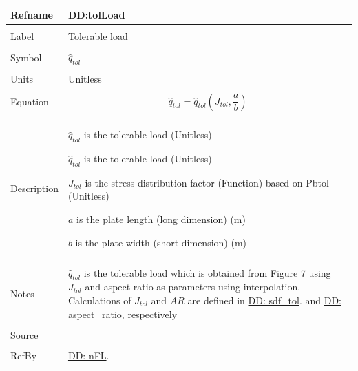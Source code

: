 \documentclass[12pt]{article}
\begin{document}
~\newline
\noindent \begin{minipage}{\textwidth}
\begin{tabular}{p{} p{}}
\toprule \textbf{Refname} & \textbf{DD:tolLoad}
\label{DD:tolLoad}
\\ \midrule \\
Label & Tolerable load
\\ \midrule \\
Symbol & ${\hat{q}_{tol}}$
\\ \midrule \\
Units & Unitless
\\ \midrule \\
Equation & \begin{dmath}
           {\hat{q}_{tol}}={\hat{q}_{tol}}\left({J_{tol}},\frac{a}{b}\right)
           \end{dmath}
\\ \midrule \\
Description & \begin{symbDescription}
              \item{${\hat{q}_{tol}}$ is the tolerable load (Unitless)}
              \item{${\hat{q}_{tol}}$ is the tolerable load (Unitless)}
              \item{${J_{tol}}$ is the stress distribution factor (Function) based on Pbtol (Unitless)}
              \item{$a$ is the plate length (long dimension) (m)}
              \item{$b$ is the plate width (short dimension) (m)}
              \end{symbDescription}
\\ \midrule \\
Notes & ${\hat{q}_{tol}}$ is the tolerable load which is obtained from Figure 7 using ${J_{tol}}$ and aspect ratio as parameters using interpolation. Calculations of ${J_{tol}}$ and $AR$ are defined in \hyperref[DD:sdf.tol]{DD: sdf\_tol}. and \hyperref[DD:aspect.ratio]{DD: aspect\_ratio}, respectively
\\ \midrule \\
Source & \cite{astm2009}
\\ \midrule \\
RefBy & \hyperref[DD:nFL]{DD: nFL}.
\\ \bottomrule \end{tabular}
\end{minipage}\\
\end{document}
